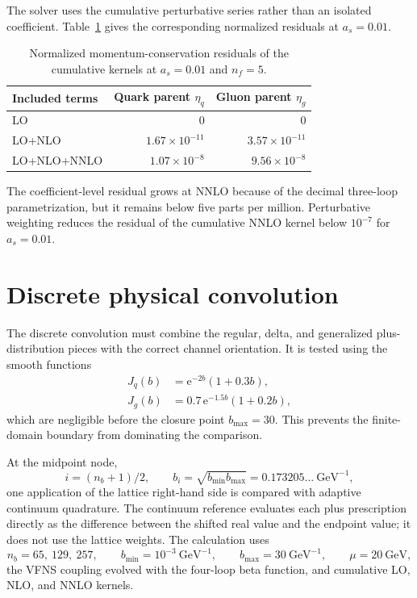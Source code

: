 \documentclass[11pt]{article}
\newcommand{\as}{a_s}
\newcommand{\ee}{\mathrm{e}}
\begin{document}
The solver uses the cumulative perturbative series rather than an isolated
coefficient. Table~\ref{tab:cumulative-momentum} gives the corresponding
normalized residuals at \(\as=0.01\).

\begin{table}[H]
\centering
\caption{Normalized momentum-conservation residuals of the cumulative
kernels at \(\as=0.01\) and \(n_f=5\).}
\label{tab:cumulative-momentum}
\begin{tabular}{lrr}
\toprule
Included terms & Quark parent \(\eta_q\) & Gluon parent \(\eta_g\)\\
\midrule
LO & \(0\) & \(0\)\\
LO+NLO & \(1.67\times10^{-11}\) & \(3.57\times10^{-11}\)\\
LO+NLO+NNLO & \(1.07\times10^{-8}\) & \(9.56\times10^{-8}\)\\
\bottomrule
\end{tabular}
\end{table}

The coefficient-level residual grows at NNLO because of the decimal
three-loop parametrization, but it remains below five parts per million.
Perturbative weighting reduces the residual of the cumulative NNLO kernel
below \(10^{-7}\) for \(\as=0.01\).

\section{Discrete physical convolution}

The discrete convolution must combine the regular, delta, and generalized
plus-distribution pieces with the correct channel orientation. It is tested
using the smooth functions
\begin{align}
  J_q(b)&=\ee^{-2b}(1+0.3b),\\
  J_g(b)&=0.7\,\ee^{-1.5b}(1+0.2b),
\end{align}
which are negligible before the closure point \(b_{\max}=30\). This prevents
the finite-domain boundary from dominating the comparison.

At the midpoint node,
\[
  i=(n_b+1)/2,\qquad
  b_i=\sqrt{b_{\min}b_{\max}}
      =0.173205\ldots~\mathrm{GeV}^{-1},
\]
one application of the lattice right-hand side is compared with adaptive
continuum quadrature. The continuum reference
evaluates each plus prescription directly as the difference between the
shifted real value and the endpoint value; it does not use the lattice
weights. The calculation uses
\[
  n_b=65,\ 129,\ 257,\qquad
  b_{\min}=10^{-3}~\mathrm{GeV}^{-1},\qquad
  b_{\max}=30~\mathrm{GeV}^{-1},\qquad
  \mu=20~\mathrm{GeV},
\]
the VFNS coupling evolved with the four-loop beta function, and cumulative
LO, NLO, and NNLO kernels.
\end{document}
